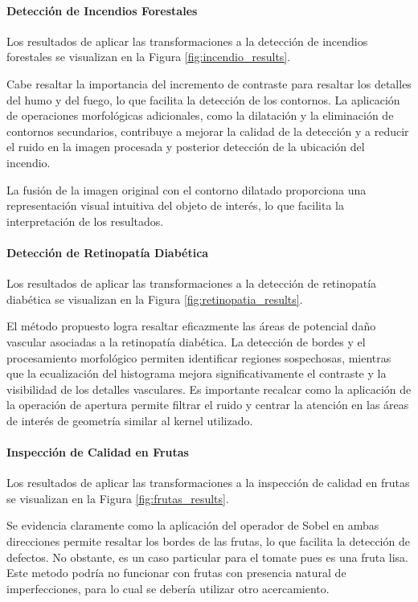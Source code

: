 \paragraph{Detección de Incendios Forestales} Los resultados de aplicar las transformaciones a la detección de incendios forestales se visualizan en la Figura \ref{fig:incendio_results}.

Cabe resaltar la importancia del incremento de contraste para resaltar los detalles del humo y del fuego, lo que facilita la detección de los contornos. La aplicación de operaciones morfológicas adicionales, como la dilatación y la eliminación de contornos secundarios, contribuye a mejorar la calidad de la detección y a reducir el ruido en la imagen procesada y posterior detección de la ubicación del incendio.

La fusión de la imagen original con el contorno dilatado proporciona una representación visual intuitiva del objeto de interés, lo que facilita la interpretación de los resultados. \\

\paragraph{Detección de Retinopatía Diabética} Los resultados de aplicar las transformaciones a la detección de retinopatía diabética se visualizan en la Figura \ref{fig:retinopatia_results}.

El método propuesto logra resaltar eficazmente las áreas de potencial daño vascular asociadas a la retinopatía diabética. La detección de bordes y el procesamiento morfológico permiten identificar regiones sospechosas, mientras que la ecualización del histograma mejora significativamente el contraste y la visibilidad de los detalles vasculares. Es importante recalcar como la aplicación de la operación
de apertura permite filtrar el ruido y centrar la atención en las áreas de interés de geometría similar al kernel utilizado.\\

\paragraph{Inspección de Calidad en Frutas} Los resultados de aplicar las transformaciones a la inspección de calidad en frutas se visualizan en la Figura \ref{fig:frutas_results}.


Se evidencia claramente como la aplicación del operador de Sobel en ambas direcciones permite resaltar los bordes de las frutas, lo que facilita la detección de defectos. No obstante, es un caso particular para el tomate pues es una fruta lisa. Este metodo podría no funcionar con frutas con presencia natural de imperfecciones, para lo cual se debería utilizar otro acercamiento.\\


